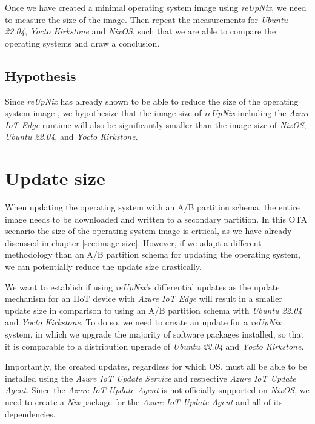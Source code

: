 Once we have created a minimal operating system image using \textit{reUpNix}, we
need to measure the size of the image. Then repeat the measurements for
\textit{Ubuntu 22.04}, \textit{Yocto Kirkstone} and \textit{NixOS}, such that
we are able to compare the operating systems and draw a conclusion.

\subsection{Hypothesis}
Since \textit{reUpNix} has already shown to be able to reduce the size of the
operating system image \cite{gollenstede:23:lctes}, we hypothesize that the
image size of \textit{reUpNix} including the \textit{Azure IoT Edge} runtime
will also be significantly smaller than the image size of \textit{NixOS},
\textit{Ubuntu 22.04}, and \textit{Yocto Kirkstone}.


\section{Update size}
\label{sec:update-size}
When updating the operating system with an A/B partition schema, the entire
image needs to be downloaded and written to a secondary partition. In this
\ac{OTA} scenario the size of the operating system image is critical, as we have
already discussed in chapter \ref{sec:image-size}.
However, if we adapt a different methodology than an A/B partition schema
for updating the operating system, we can potentially reduce the update size
drastically.

We want to establish if using \textit{reUpNix}'s differential updates as the
update mechanism for an \ac{IIoT} device with \textit{Azure IoT Edge}
will result in a smaller update size in comparison to using an A/B partition schema with
\textit{Ubuntu 22.04} and \textit{Yocto Kirkstone}. To do so, we need to create
an update for a \textit{reUpNix} system, in which we upgrade the majority
of software packages installed, so that it is comparable to a distribution upgrade
of \textit{Ubuntu 22.04} and \textit{Yocto Kirkstone}.

Importantly, the created updates, regardless for which \ac{OS}, must all be
able to be installed using the \textit{Azure IoT Update Service} and respective
\textit{Azure IoT Update Agent}. Since the \textit{Azure IoT Update Agent} is
not officially supported on \textit{NixOS}, we need to create a \textit{Nix} package
for the \textit{Azure IoT Update Agent} and all of its dependencies.

